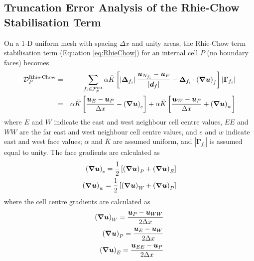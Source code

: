 \documentclass[sn-mathphys,Numbered]{sn-jnl}%
\newcommand{\bb}{\boldsymbol}
\begin{document}
\begin{appendices}
\section{Truncation Error Analysis of the Rhie-Chow Stabilisation Term}
\label{app:RhieChow}
On a 1-D uniform mesh with spacing $\Delta x$ and unity areas, the Rhie-Chow term stabilisation term (Equation \ref{eq:RhieChow}) for an internal cell $P$ (no boundary faces) becomes
\begin{eqnarray}
\mathcal{D}_P^{\text {Rhie-Chow}}
	&=&
	\sum_{f_i \in \mathcal{F}^{\text{int}}_p} \alpha \bar{K}
	\left[
	\left|\bb{\Delta}_{f_i} \right| \frac{ \bb{u}_{N_{f_i}} - \bb{u}_P}{\left|\bb{d}_f\right|}
	- \bb{\Delta}_{f_i} \cdot \left(\bb{\nabla} \bb{u} \right)_f
	\right]
	\left|\bb{\Gamma}_{{f_i}}\right| \notag \\
	&=& 
	\alpha \bar{K} \left[ \frac{ \bb{u}_{E} - \bb{u}_P}{\Delta x} - \left(\bb{\nabla} \bb{u} \right)_e \right]
	+ \alpha \bar{K} \left[ \frac{ \bb{u}_{W} - \bb{u}_P}{\Delta x} + \left(\bb{\nabla} \bb{u} \right)_w \right]
	\notag \\
\end{eqnarray}
where $E$ and $W$ indicate the east and west neighbour cell centre values, $EE$ and $WW$ are the far east and west neighbour cell centre values, and $e$ and $w$ indicate east and west face values;
$\alpha$ and $\bar{K}$ are assumed uniform, and $\left|\bb{\Gamma}_{{f_i}}\right|$ is assumed equal to unity.
The face gradients are calculated as
\begin{eqnarray}
	\left(\bb{\nabla} \bb{u} \right)_e = \frac{1}{2} \left[ \left(\bb{\nabla} \bb{u} \right)_P + \left(\bb{\nabla} \bb{u} \right)_E \right]  \notag \\
	\left(\bb{\nabla} \bb{u} \right)_w = \frac{1}{2} \left[ \left(\bb{\nabla} \bb{u} \right)_W + \left(\bb{\nabla} \bb{u} \right)_P \right]
\end{eqnarray}
where the cell centre gradients are calculated as
\begin{eqnarray}
	\left(\bb{\nabla} \bb{u} \right)_W = \frac{\bb{u}_{P} - \bb{u}_{WW}}{2\Delta x} \notag \\
	\left(\bb{\nabla} \bb{u} \right)_P = \frac{\bb{u}_{E} - \bb{u}_{W}}{2\Delta x} \notag \\
	\left(\bb{\nabla} \bb{u} \right)_E = \frac{\bb{u}_{EE} - \bb{u}_{P}}{2\Delta x}
\end{eqnarray}


\end{appendices}
\end{document}
